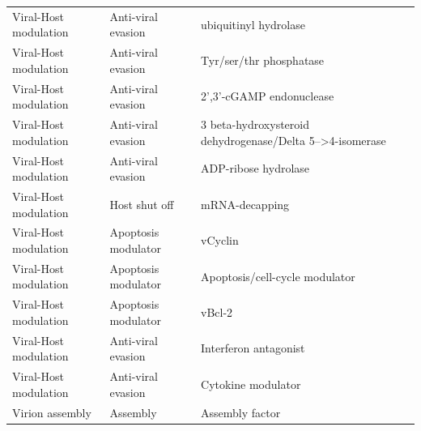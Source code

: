 \documentclass[
  sn-nature,
]{sn-jnl}
\begin{document}
\begin{longtable}{lll}
Viral-Host modulation & Anti-viral evasion & ubiquitinyl hydrolase\\
Viral-Host modulation & Anti-viral evasion & Tyr/ser/thr phosphatase\\
Viral-Host modulation & Anti-viral evasion & 2',3'-cGAMP endonuclease\\
Viral-Host modulation & Anti-viral evasion & 3 beta-hydroxysteroid dehydrogenase/Delta 5-->4-isomerase\\
Viral-Host modulation & Anti-viral evasion & ADP-ribose hydrolase\\
Viral-Host modulation & Host shut off & mRNA-decapping\\
Viral-Host modulation & Apoptosis modulator & vCyclin\\
Viral-Host modulation & Apoptosis modulator & Apoptosis/cell-cycle modulator\\
Viral-Host modulation & Apoptosis modulator & vBcl-2\\
Viral-Host modulation & Anti-viral evasion & Interferon antagonist\\
Viral-Host modulation & Anti-viral evasion & Cytokine modulator\\
Virion assembly & Assembly & Assembly factor\\
\bottomrule

\end{longtable}

\restoregeometry
\clearpage
\end{document}
